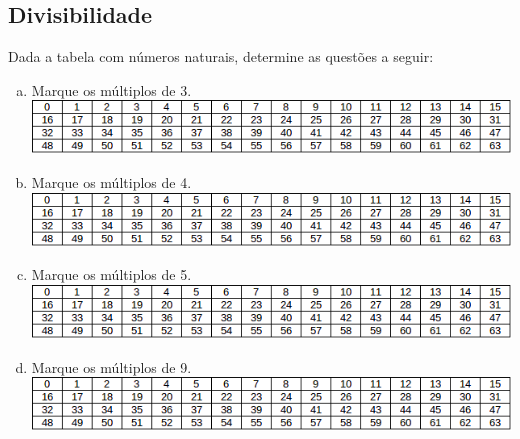 

\subsection{Divisibilidade}

\item Dada a tabela com números naturais, determine as questões a seguir:
\begin{enumerate}[a)]
	\item Marque os múltiplos de 3.\\
	\includegraphics[scale=1]{figuras/fig101.png}
	\item Marque os múltiplos de 4.\\
	\includegraphics[scale=1]{figuras/fig101.png}
	\item Marque os múltiplos de 5.\\
	\includegraphics[scale=1]{figuras/fig101.png}
	\item Marque os múltiplos de 9.\\
	\includegraphics[scale=1]{figuras/fig101.png}
\end{enumerate}

